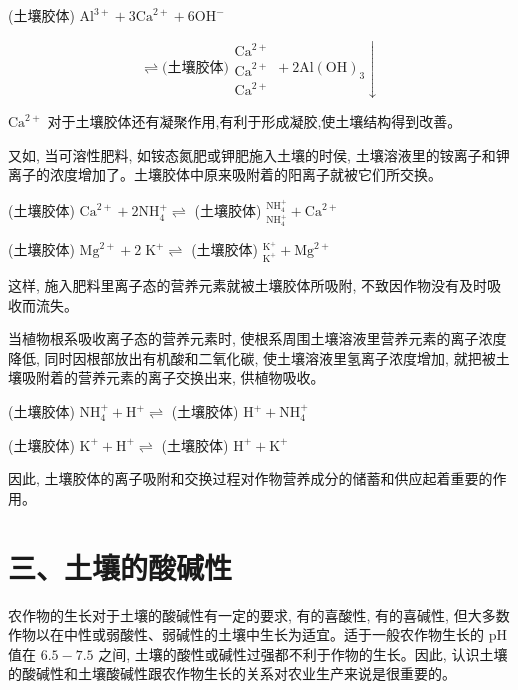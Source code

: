 \documentclass[10pt]{article}
\begin{document}
(土壤胶体) \({\mathrm{{Al}}}^{3 + } + 3{\mathrm{{Ca}}}^{2 + } + 6{\mathrm{{OH}}}^{ - }\)

\[
\rightleftharpoons \text{(土壤胶体)}\begin{array}{l} {\mathrm{{Ca}}}^{2 + } \\ {\mathrm{{Ca}}}^{2 + } \\ {\mathrm{{Ca}}}^{2 + } \end{array} + 2\mathrm{{Al}}{\left( \mathrm{{OH}}\right) }_{3} \downarrow
\]

\({\mathrm{{Ca}}}^{2 + }\) 对于土壤胶体还有凝聚作用,有利于形成凝胶,使土壤结构得到改善。

又如, 当可溶性肥料, 如铵态氮肥或钾肥施入土壤的时侯, 土壤溶液里的铵离子和钾离子的浓度增加了。土壤胶体中原来吸附着的阳离子就被它们所交换。

(土壤胶体) \({\mathrm{{Ca}}}^{2 + } + 2{\mathrm{{NH}}}_{4}^{ + } \rightleftharpoons\) (土壤胶体) \({}_{{\mathrm{{NH}}}_{4}^{ + }}^{{\mathrm{{NH}}}_{4}^{ + }} + {\mathrm{{Ca}}}^{2 + }\)

(土壤胶体) \({\mathrm{{Mg}}}^{2 + } + 2{\mathrm{\;K}}^{ + } \rightleftharpoons\) (土壤胶体) \({}_{{\mathrm{K}}^{ + }}^{{\mathrm{K}}^{ + }} + {\mathrm{{Mg}}}^{2 + }\)

这样, 施入肥料里离子态的营养元素就被土壤胶体所吸附, 不致因作物没有及时吸收而流失。

当植物根系吸收离子态的营养元素时, 使根系周围土壤溶液里营养元素的离子浓度降低, 同时因根部放出有机酸和二氧化碳, 使土壤溶液里氢离子浓度增加, 就把被土壤吸附着的营养元素的离子交换出来, 供植物吸收。

(土壤胶体) \({\mathrm{{NH}}}_{4}^{ + } + {\mathrm{H}}^{ + } \rightleftharpoons\) (土壤胶体) \({\mathrm{H}}^{ + } + {\mathrm{{NH}}}_{4}^{ + }\)

(土壤胶体) \({\mathrm{K}}^{ + } + {\mathrm{H}}^{ + } \rightleftharpoons\) (土壤胶体) \({\mathrm{H}}^{ + } + {\mathrm{K}}^{ + }\)

因此, 土壤胶体的离子吸附和交换过程对作物营养成分的储蓄和供应起着重要的作用。

\section*{三、土壤的酸碱性}

农作物的生长对于土壤的酸碱性有一定的要求, 有的喜酸性, 有的喜碱性, 但大多数作物以在中性或弱酸性、弱碱性的土壤中生长为适宜。适于一般农作物生长的 \(\mathrm{{pH}}\) 值在 \({6.5} - {7.5}\) 之间, 土壤的酸性或碱性过强都不利于作物的生长。因此, 认识土壤的酸碱性和土壤酸碱性跟农作物生长的关系对农业生产来说是很重要的。
\end{document}

